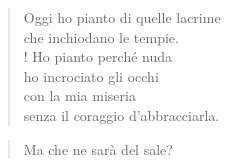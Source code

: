 \begin{verse}
Oggi ho pianto di quelle lacrime\\
che inchiodano le tempie.\\!
Ho pianto perché nuda\\
ho incrociato gli occhi\\
con la mia miseria\\
senza il coraggio d'abbracciarla.\\
\end{verse}
\begin{verse}
    \hfill Ma che ne sarà del sale?
\end{verse}